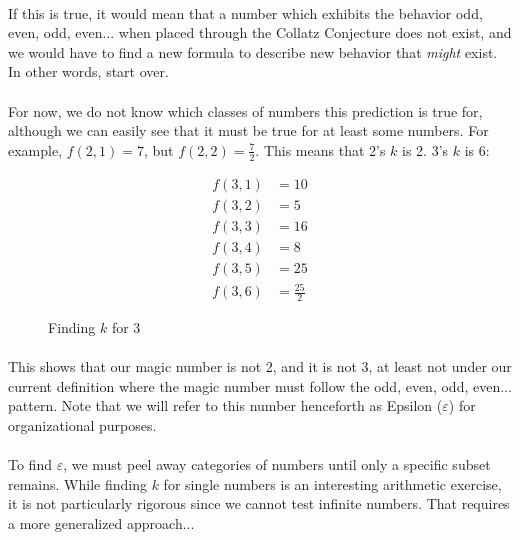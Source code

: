 \documentclass[12pt,letterpaper]{article}
\begin{document}
			\paragraph{} If this is true, it would mean that a number which exhibits the behavior odd, even, odd, even... when placed through the Collatz Conjecture does not exist, and we would have to find a new formula to describe new behavior that \textit{might} exist. In other words, start over.
			
			\paragraph{} For now, we do not know which classes of numbers this prediction is true for, although we can easily see that it must be true for at least some numbers. For example, $f(2, 1) = 7$, but $f(2, 2) = \frac{7}{2}$. This means that 2's $k$ is 2. 3's $k$ is 6:
			
			\begin{figure}[h]
				\begin{align*}
				f(3, 1) &= 10\\
				f(3, 2) &= 5\\
				f(3, 3) &= 16\\
				f(3, 4) &= 8\\
				f(3, 5) &= 25\\
				f(3, 6) &= \frac{25}{2}
				\end{align*}
				
				\caption{Finding $k$ for 3}
			\end{figure}
			\newpage %
			
			\paragraph{} This shows that our magic number is not 2, and it is not 3, at least not under our current definition where the magic number must follow the odd, even, odd, even... pattern. Note that we will refer to this number henceforth as Epsilon ($\varepsilon$) for organizational purposes.
			
			\paragraph{} To find $\varepsilon$, we must peel away categories of numbers until only a specific subset remains. While finding $k$ for single numbers is an interesting arithmetic exercise, it is not particularly rigorous since we cannot test infinite numbers. That requires a more generalized approach...
			
\end{document}
